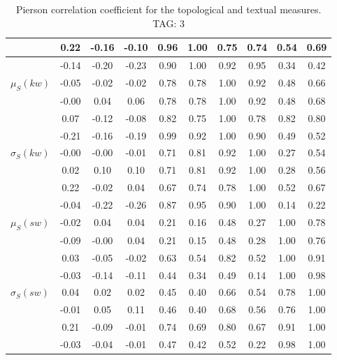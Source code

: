 \begin{table*}[h!]
\begin{center}
\begin{tabular}{| l | c | c | c | c | c | c | c | c | c |}
 & 0.22  & -0.16  & -0.10  & 0.96  & 1.00  & 0.75  & 0.74  & 0.54  & 0.69 \\\hline
 & -0.14  & -0.20  & -0.23  & 0.90  & 1.00  & 0.92  & 0.95  & 0.34  & 0.42 \\\hline
$\mu_S(kw)$ & -0.05  & -0.02  & -0.02  & 0.78  & 0.78  & 1.00  & 0.92  & 0.48  & 0.66 \\\hline
 & -0.00  & 0.04  & 0.06  & 0.78  & 0.78  & 1.00  & 0.92  & 0.48  & 0.68 \\\hline
 & 0.07  & -0.12  & -0.08  & 0.82  & 0.75  & 1.00  & 0.78  & 0.82  & 0.80 \\\hline
 & -0.21  & -0.16  & -0.19  & 0.99  & 0.92  & 1.00  & 0.90  & 0.49  & 0.52 \\\hline
$\sigma_S(kw)$ & -0.00  & -0.00  & -0.01  & 0.71  & 0.81  & 0.92  & 1.00  & 0.27  & 0.54 \\\hline
 & 0.02  & 0.10  & 0.10  & 0.71  & 0.81  & 0.92  & 1.00  & 0.28  & 0.56 \\\hline
 & 0.22  & -0.02  & 0.04  & 0.67  & 0.74  & 0.78  & 1.00  & 0.52  & 0.67 \\\hline
 & -0.04  & -0.22  & -0.26  & 0.87  & 0.95  & 0.90  & 1.00  & 0.14  & 0.22 \\\hline
$\mu_S(sw)$ & -0.02  & 0.04  & 0.04  & 0.21  & 0.16  & 0.48  & 0.27  & 1.00  & 0.78 \\\hline
 & -0.09  & -0.00  & 0.04  & 0.21  & 0.15  & 0.48  & 0.28  & 1.00  & 0.76 \\\hline
 & 0.03  & -0.05  & -0.02  & 0.63  & 0.54  & 0.82  & 0.52  & 1.00  & 0.91 \\\hline
 & -0.03  & -0.14  & -0.11  & 0.44  & 0.34  & 0.49  & 0.14  & 1.00  & 0.98 \\\hline
$\sigma_S(sw)$ & 0.04  & 0.02  & 0.02  & 0.45  & 0.40  & 0.66  & 0.54  & 0.78  & 1.00 \\\hline
 & -0.01  & 0.05  & 0.11  & 0.46  & 0.40  & 0.68  & 0.56  & 0.76  & 1.00 \\\hline
 & 0.21  & -0.09  & -0.01  & 0.74  & 0.69  & 0.80  & 0.67  & 0.91  & 1.00 \\\hline
 & -0.03  & -0.04  & -0.01  & 0.47  & 0.42  & 0.52  & 0.22  & 0.98  & 1.00 \\\hline
\end{tabular}
\caption{Pierson correlation coefficient for the topological and textual measures. TAG: 3}
\end{center}
\end{table*}